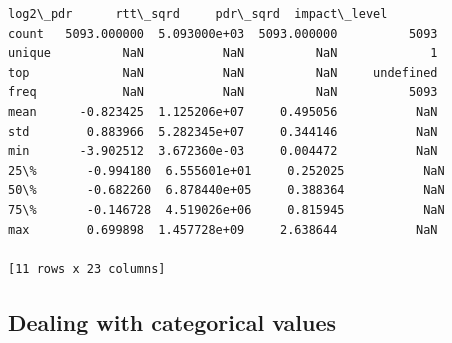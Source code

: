 \documentclass[11pt]{article}
\begin{document}
\begin{tcolorbox}[breakable, size=fbox, boxrule=.5pt, pad at break*=1mm, opacityfill=0]
\begin{Verbatim}[commandchars=\\\{\}]
           log2\_pdr      rtt\_sqrd     pdr\_sqrd  impact\_level
count   5093.000000  5.093000e+03  5093.000000          5093
unique          NaN           NaN          NaN             1
top             NaN           NaN          NaN     undefined
freq            NaN           NaN          NaN          5093
mean      -0.823425  1.125206e+07     0.495056           NaN
std        0.883966  5.282345e+07     0.344146           NaN
min       -3.902512  3.672360e-03     0.004472           NaN
25\%       -0.994180  6.555601e+01     0.252025           NaN
50\%       -0.682260  6.878440e+05     0.388364           NaN
75\%       -0.146728  4.519026e+06     0.815945           NaN
max        0.699898  1.457728e+09     2.638644           NaN

[11 rows x 23 columns]
\end{Verbatim}
\end{tcolorbox}
        
    \hypertarget{dealing-with-categorical-values}{%
\subsection{Dealing with categorical
values}\label{dealing-with-categorical-values}}
\end{document}
